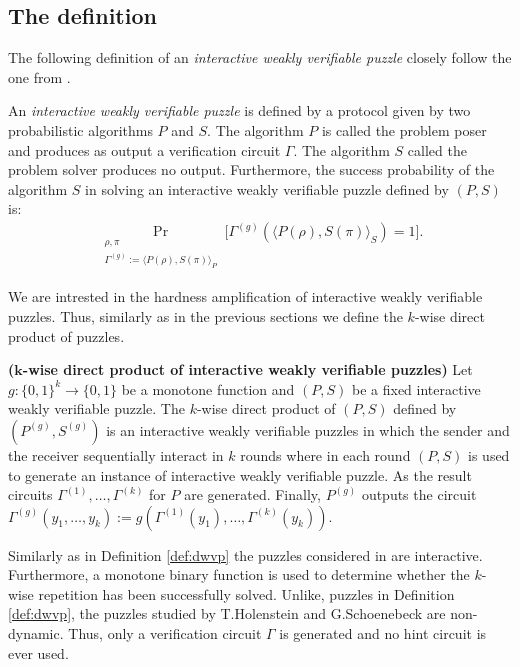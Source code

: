 \subsection{The definition}
The following definition of an \textit{interactive weakly verifiable puzzle} closely follow the one from \cite{DBLP:journals/corr/abs-1002-3534}.
\begin{definition}
An \textit{interactive weakly verifiable puzzle} is defined by a protocol given by two probabilistic algorithms $P$ and $S$.
The algorithm $P$ is called the problem poser and produces as output a verification circuit $\Gamma$.
The algorithm $S$ called the problem solver produces no output.
Furthermore, the \textnormal{success probability} of the algorithm $S$ in solving an interactive weakly verifiable puzzle defined by $(P,S)$ is:
\begin{align*}
  \underset{\substack{\rho, \pi \\ \Gamma^{(g)} := \langle P(\rho), S(\pi) \rangle_{P}}}{\Pr}\Big[\Gamma^{(g)}(\langle P(\rho),S(\pi) \rangle_{S}) = 1 \Big].
\end{align*}
\end{definition}
We are intrested in the hardness amplification of interactive weakly verifiable puzzles. Thus, similarly as in the previous sections
we define the $k$-wise direct product of puzzles.
\begin{definition}\textbf{($\boldsymbol{k}$-wise direct product of interactive weakly verifiable puzzles)}
Let $g: \{0,1\}^{k} \rightarrow \{0,1\}$ be a monotone function and $(P,S)$ be a fixed interactive weakly verifiable puzzle.
The $k$-wise direct product of $(P,S)$ defined by $(P^{(g)}, S^{(g)})$ is an interactive weakly verifiable puzzles in which the sender and the receiver
sequentially interact in $k$ rounds where in each round $(P,S)$ is used to generate an instance of interactive weakly verifiable puzzle.
As the result circuits $\Gamma^{(1)}, \dotsc, \Gamma^{(k)}$ for $P$ are generated.
Finally, $P^{(g)}$ outputs the circuit $\Gamma^{(g)}(y_1, \dotsc, y_k) := g(\Gamma^{(1)}(y_1), \dotsc, \Gamma^{(k)}(y_k))$.
\end{definition}

Similarly as in Definition \ref{def:dwvp} the puzzles considered in \cite{DBLP:journals/corr/abs-1002-3534} are interactive.
Furthermore, a monotone binary function is used to determine whether the $k$-wise repetition
has been successfully solved. Unlike, puzzles in Definition \ref{def:dwvp}, the puzzles studied by T.Holenstein and G.Schoenebeck
are non-dynamic. Thus, only a verification circuit $\Gamma$ is generated and no hint circuit is ever used.

